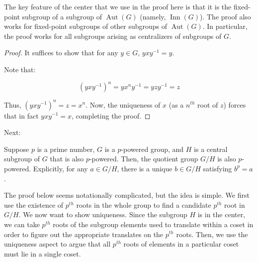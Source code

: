 \documentclass{ucetd}
\begin{document}
The key feature of the center that we use in the proof here is that it
is the fixed-point subgroup of a subgroup of $\operatorname{Aut}(G)$
(namely, $\operatorname{Inn}(G)$). The proof also works for
fixed-point subgroups of other subgroups of
$\operatorname{Aut}(G)$. In particular, the proof works for all
subgroups arising as centralizers of subgroups of $G$.

\begin{proof}
  It suffices to show that for any $y \in G$, $yxy^{-1} = y$.

  Note that:

  $$(yxy^{-1})^n = yx^ny^{-1} = yzy^{-1} = z$$

  Thus, $(yxy^{-1})^n = z = x^n$. Now, the uniqueness of $x$ (as a
  $n^{th}$ root of $z$) forces that in fact $yxy^{-1} = x$, completing
  the proof.
\end{proof}

Next:

\begin{lemma}\label{picentralimpliesqpi}
  Suppose $p$ is a prime number, $G$ is a $p$-powered group, and $H$
  is a central subgroup of $G$ that is also $p$-powered. Then, the
  quotient group $G/H$ is also $p$-powered. Explicitly, for any $a \in
  G/H$, there is a unique $b \in G/H$ satisfying $b^p = a$.
\end{lemma}

The proof below seems notationally complicated, but the idea is
simple. We first use the existence of $p^{th}$ roots in the whole
group to find a candidate $p^{th}$ root in $G/H$. We now want to show
uniqueness. Since the subgroup $H$ is in the center, we can take
$p^{th}$ roots of the subgroup elements used to translate within a
coset in order to figure out the appropriate translates on the
$p^{th}$ roots. Then, we use the uniqueness aspect to argue that all
$p^{th}$ roots of elements in a particular coset must lie in a single
coset.
\end{document}

